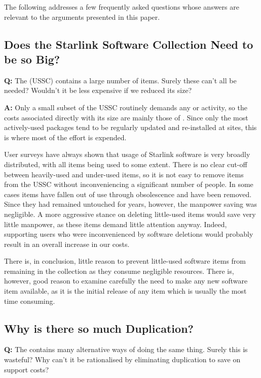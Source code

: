 The following addresses a few frequently asked questions whose answers
are relevant to the arguments presented in this paper.

\subsection{\label{USSC}Does the Starlink Software Collection Need to
be so Big?}

{\Large \bf Q:} The  (USSC)
contains a large number of items. Surely these can't all be needed?
Wouldn't it be less expensive if we reduced its size?

{\Large \bf A:} Only a small subset of the USSC routinely demands
any \st{} or \st{} activity, so the costs associated
directly with its size are mainly those of \st{}. Since only
the most actively-used packages tend to be regularly updated and
re-installed at sites, this is where most of the effort is expended.

User surveys have always shown that usage of Starlink software is very
broadly distributed, with all items being used to some extent. There
is no clear cut-off between heavily-used and under-used items, so it
is not easy to remove items from the USSC without inconveniencing a
significant number of people. In some cases items have fallen out of
use through obsolescence and have been removed.  Since they had
remained untouched for years, however, the manpower saving was
negligible.  A more aggressive stance on deleting little-used items
would save very little manpower, as these items demand little
attention anyway. Indeed, supporting users who were inconvenienced by
software deletions would probably result in an overall increase in our
costs.

There is, in conclusion, little reason to prevent little-used software
items from remaining in the collection as they consume negligible
resources. There is, however, good reason to examine carefully the
need to make any new software item available, as it is the initial
release of any item which is usually the most time consuming.

\subsection{\label{duplication}Why is there so much Duplication?}

{\Large \bf Q:} The  contains
many alternative ways of doing the same thing. Surely this is
wasteful? Why can't it be rationalised by eliminating duplication to
save on support costs?

